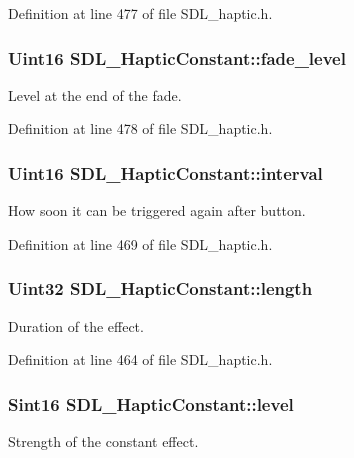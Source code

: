 Definition at line 477 of file S\+D\+L\+\_\+haptic.\+h.

\hypertarget{structSDL__HapticConstant_a49f6499c89f3e494efbe92f12277c949}{
\subsubsection[{fade\+\_\+level}]{\setlength{\rightskip}{0pt plus 5cm}Uint16 S\+D\+L\+\_\+\+Haptic\+Constant\+::fade\+\_\+level}}\label{structSDL__HapticConstant_a49f6499c89f3e494efbe92f12277c949}
Level at the end of the fade. 

Definition at line 478 of file S\+D\+L\+\_\+haptic.\+h.

\hypertarget{structSDL__HapticConstant_ab1f7f0df856f4cf1fdf937cb886226b4}{
\subsubsection[{interval}]{\setlength{\rightskip}{0pt plus 5cm}Uint16 S\+D\+L\+\_\+\+Haptic\+Constant\+::interval}}\label{structSDL__HapticConstant_ab1f7f0df856f4cf1fdf937cb886226b4}
How soon it can be triggered again after button. 

Definition at line 469 of file S\+D\+L\+\_\+haptic.\+h.

\hypertarget{structSDL__HapticConstant_aeb994c356b1d236b060f277d157e98ec}{
\subsubsection[{length}]{\setlength{\rightskip}{0pt plus 5cm}Uint32 S\+D\+L\+\_\+\+Haptic\+Constant\+::length}}\label{structSDL__HapticConstant_aeb994c356b1d236b060f277d157e98ec}
Duration of the effect. 

Definition at line 464 of file S\+D\+L\+\_\+haptic.\+h.

\hypertarget{structSDL__HapticConstant_a5b095eea77464623ed57af15f29f4ca6}{
\subsubsection[{level}]{\setlength{\rightskip}{0pt plus 5cm}Sint16 S\+D\+L\+\_\+\+Haptic\+Constant\+::level}}\label{structSDL__HapticConstant_a5b095eea77464623ed57af15f29f4ca6}
Strength of the constant effect. 

